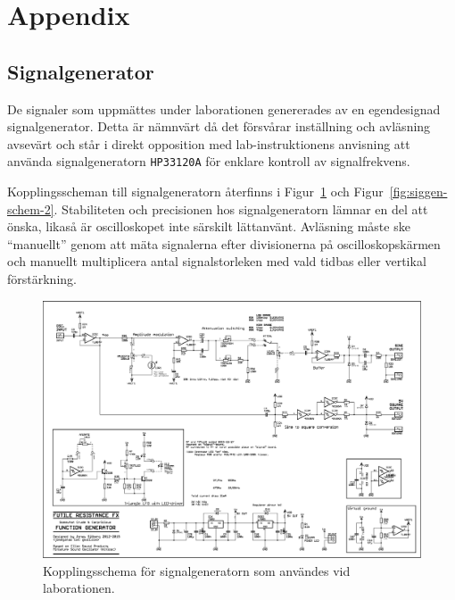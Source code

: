 %
%

\section{Appendix}\label{appendix}

\subsection{Signalgenerator}
De signaler som uppmättes under laborationen genererades av en egendesignad
signalgenerator. Detta är nämnvärt då det försvårar inställning och avläsning
avsevärt och står i direkt opposition med lab-instruktionens anvisning att
använda signalgeneratorn \texttt{HP33120A} för enklare kontroll av
signalfrekvens.

\par Kopplingsscheman till signalgeneratorn återfinns i
Figur~\ref{fig:siggen-schem-1} och Figur~\ref{fig:siggen-schem-2}.
Stabiliteten och precisionen hos signalgeneratorn lämnar en del att önska,
likaså är oscilloskopet inte särskilt lättanvänt.  Avläsning måste ske
``manuellt'' genom att mäta signalerna efter divisionerna på oscilloskopskärmen
och manuellt multiplicera antal signalstorleken med vald tidbas eller vertikal
förstärkning.


\begin{figure}  \centering
  \includegraphics[width=\linewidth]{img/signal-generator_schematic-1}
  \caption{Kopplingsschema för signalgeneratorn som användes vid laborationen.}
  \label{fig:siggen-schem-1}
\end{figure}

